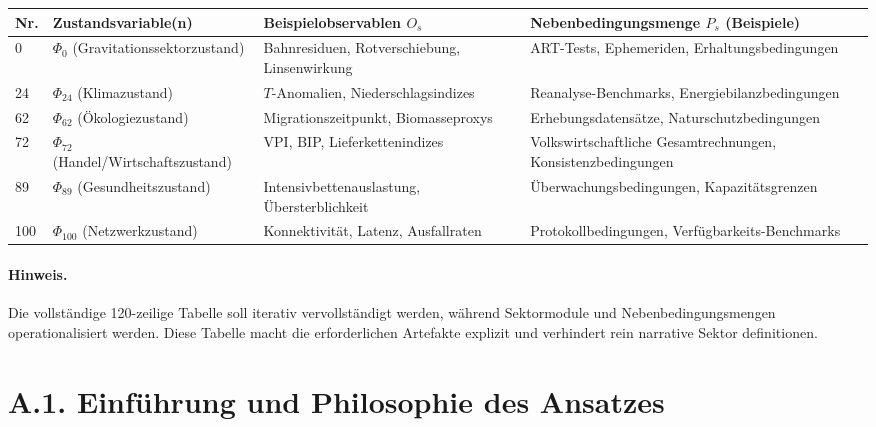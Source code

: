 \documentclass[13pt,a4paper]{article}
\begin{document}
	\begin{longtable}{|p{0.8cm}|p{4.2cm}|p{4.5cm}|p{4.7cm}|}
		\hline
		\textbf{Nr.} & \textbf{Zustandsvariable(n)} & \textbf{Beispielobservablen $O_s$} & \textbf{Nebenbedingungsmenge $P_s$ (Beispiele)} \\
		\hline
		\endhead
		0 & $\Phi_0$ (Gravitationssektorzustand) & Bahnresiduen, Rotverschiebung, Linsenwirkung & ART-Tests, Ephemeriden, Erhaltungsbedingungen \\
		\hline
		24 & $\Phi_{24}$ (Klimazustand) & $T$-Anomalien, Niederschlagsindizes & Reanalyse-Benchmarks, Energiebilanzbedingungen \\
		\hline
		62 & $\Phi_{62}$ (Ökologiezustand) & Migrationszeitpunkt, Biomasseproxys & Erhebungsdatensätze, Naturschutzbedingungen \\
		\hline
		72 & $\Phi_{72}$ (Handel/Wirtschaftszustand) & VPI, BIP, Lieferkettenindizes & Volkswirtschaftliche Gesamtrechnungen, Konsistenzbedingungen \\
		\hline
		89 & $\Phi_{89}$ (Gesundheitszustand) & Intensivbettenauslastung, Übersterblichkeit & Überwachungsbedingungen, Kapazitätsgrenzen \\
		\hline
		100 & $\Phi_{100}$ (Netzwerkzustand) & Konnektivität, Latenz, Ausfallraten & Protokollbedingungen, Verfügbarkeits-Benchmarks \\
		\hline
	\end{longtable}
	
	\paragraph{Hinweis.}
	Die vollständige 120-zeilige Tabelle soll iterativ vervollständigt werden, während Sektormodule und Nebenbedingungsmengen operationalisiert werden. Diese Tabelle macht die erforderlichen Artefakte explizit und verhindert rein narrative Sektor definitionen.
	
	\section*{A.1. Einführung und Philosophie des Ansatzes}
	
\end{document}
